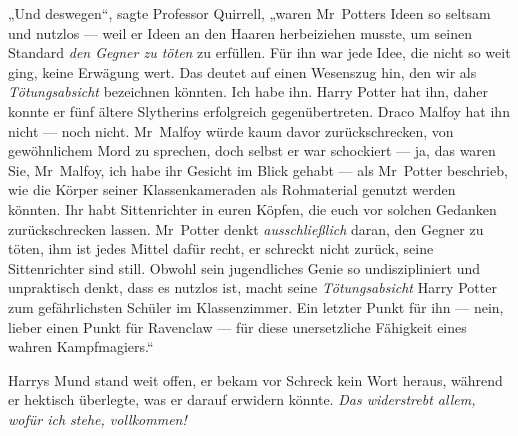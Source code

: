 „Und deswegen“, sagte Professor Quirrell, „waren Mr~Potters Ideen so seltsam und nutzlos — weil er Ideen an den Haaren herbeiziehen musste, um seinen Standard \emph{den Gegner zu töten} zu erfüllen. Für ihn war jede Idee, die nicht so weit ging, keine Erwägung wert. Das deutet auf einen Wesenszug hin, den wir als \emph{Tötungsabsicht} bezeichnen könnten. Ich habe ihn. Harry Potter hat ihn, daher konnte er fünf ältere Slytherins erfolgreich gegenübertreten. Draco Malfoy hat ihn nicht — noch nicht. Mr~Malfoy würde kaum davor zurückschrecken, von gewöhnlichem Mord zu sprechen, doch selbst er war schockiert — ja, das waren Sie, Mr~Malfoy, ich habe ihr Gesicht im Blick gehabt — als Mr~Potter beschrieb, wie die Körper seiner Klassenkameraden als Rohmaterial genutzt werden könnten. Ihr habt Sittenrichter in euren Köpfen, die euch vor solchen Gedanken zurückschrecken lassen. Mr~Potter denkt \emph{ausschließlich} daran, den Gegner zu töten, ihm ist jedes Mittel dafür recht, er schreckt nicht zurück, seine Sittenrichter sind still. Obwohl sein jugendliches Genie so undiszipliniert und unpraktisch denkt, dass es nutzlos ist, macht seine \emph{Tötungsabsicht} Harry Potter zum gefährlichsten Schüler im Klassenzimmer. Ein letzter Punkt für ihn — nein, lieber einen Punkt für Ravenclaw — für diese unersetzliche Fähigkeit eines wahren Kampfmagiers.“

Harrys Mund stand weit offen, er bekam vor Schreck kein Wort heraus, während er hektisch überlegte, was er darauf erwidern könnte. \emph{Das widerstrebt allem, wofür ich stehe, vollkommen!}


